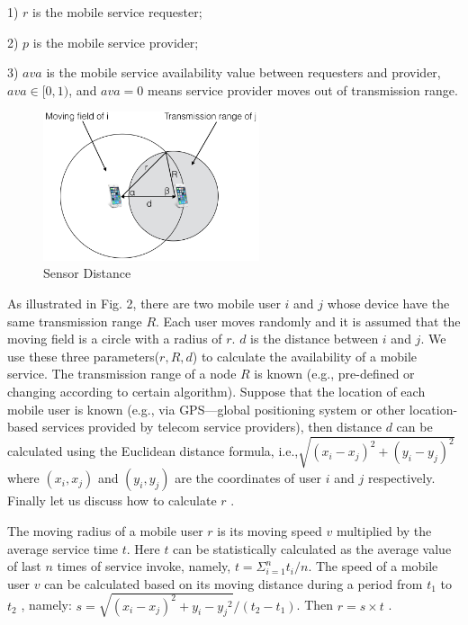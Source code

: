 \documentclass[10pt,journal,compsoc]{IEEEtran}
\begin{document}
​1) $r$ is the mobile service requester;

​2) $p$ is the mobile service provider;

​3) $ava$ is the mobile service availability value between requesters and provider, $ava \in [0,1)$, and $ava=0$ means service provider moves out of transmission range.


\begin{figure}[!t]
\centering
\includegraphics[width=2.5in]{./img/pic3.png}
\caption{Sensor Distance}
\label{fig_sd}
\end{figure}

As illustrated in Fig. 2, there are two mobile user $i$ and $j$ whose device have the same transmission range $R$. Each user moves randomly and it is assumed that the moving field is a circle with a radius of $r$. $d$ is the distance between $i$ and $j$. We use these three parameters($r,R,d$) to calculate the availability of a mobile service. The transmission range of a node $R$ is known (e.g., pre-defined or changing according to certain algorithm). Suppose that the location of each mobile user is known (e.g., via GPS—global positioning system or other location-based services provided by telecom service providers\cite{chadil2008real}), then distance $d$ can be calculated using the Euclidean distance formula, i.e.,$\sqrt{{(x_i-x_j)^2}+({y_i-y_j})^2}$ where $(x_i, x_j)$ and $(y_i, y_j)$ are the coordinates of user $i$ and $j$ respectively. Finally let us discuss how to calculate $r$ \cite{Yang2010}.

The moving radius of a mobile user $r$ is its moving speed $v$ multiplied by the average service time $t$. Here $t$ can be statistically calculated as the average value of last $n$ times of service invoke, namely, $t = \Sigma_{i=1}^{n}t_i/n$. The speed of a mobile user $v$ can be calculated based on its moving distance during a period from $t_1$ to $t_2$ \cite{ko2000location}, namely: $s = \sqrt{{(x_i-x_j)^2}+{y_i-y_j}^2}/(t_2-t_1)$. Then $r = s \times t$ \cite{Yang2010}.
\end{document}
